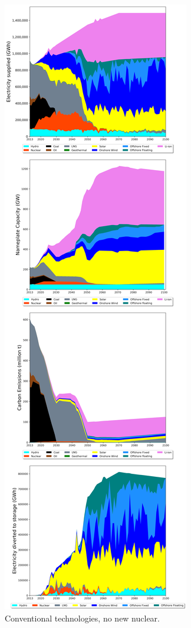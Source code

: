\begin{figure}[h] 
\centering
\label{scen1}
\includegraphics[scale=0.25]{figures/conv_nonuc}
\caption{Conventional technologies, no new nuclear.}
\end{figure}

